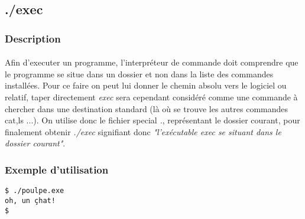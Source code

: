 \subsection{./exec}

\subsubsection*{Description}

\paragraph{}
Afin d'executer un programme, l'interpréteur de commande doit comprendre que le
programme se situe dans un dossier et non dans la liste des commandes
installées.  Pour ce faire on peut lui donner le chemin absolu vers le logiciel
ou relatif, taper directement \emph{exec} sera cependant considéré comme une
commande à chercher dans une destination standard (là où se trouve les autres
commandes cat,ls ...).  On utilise donc le fichier special \emph{.},
représentant le dossier courant, pour finalement obtenir \emph{./exec}
signifiant donc \emph{"l'exécutable exec se situant dans le dossier courant"}.

\subsubsection*{Exemple d'utilisation}
\begin{lstlisting}
$ ./poulpe.exe
oh, un çhat!
$ 
\end{lstlisting}
